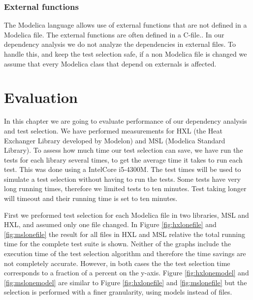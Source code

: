 \documentclass{cslthse-msc}
\begin{document}
\subsection{External functions}
The Modelica language allows use of external functions that are not defined in a Modelica file. The external functions are often defined in a C-file.\cite{modelicamodelica}. In our dependency analysis we do not analyze the dependencies in external files. To handle this, and keep the test selection safe, if a non Modelica file is changed we assume that every Modelica class that depend on externals is affected.


\chapter[Evaluation]{Evaluation}
In this chapter we are going to evaluate performance of our dependency analysis and test selection. We have performed measurements for HXL (the Heat Exchanger Library developed by Modelon) and MSL (Modelica Standard Library). To assess how much time our test selection can save, we have run the tests for each library several times, to get the average time it takes to run each test. This was done using a Intel\textregistered Core \texttrademark i5-4300M. The test times will be used to simulate a test selection without having to run the tests. Some tests have very long running times, therefore we limited tests to ten minutes. Test taking longer will timeout and their running time is set to ten minutes.

First we preformed test selection for each Modelica file in two libraries, MSL and HXL, and assumed only one file changed. In Figure \ref{fig:hxlonefile} and \ref{fig:mslonefile} the result for all files in HXL and MSL relative the total running time for the complete test suite is shown. Neither of the graphs include the execution time of the test selection algorithm and therefore the time savings are not completely accurate. However, in both cases the the test selection time corresponds to a fraction of a percent on the y-axis. Figure \ref{fig:hxlonemodel} and \ref{fig:mslonemodel} are similar to Figure \ref{fig:hxlonefile} and \ref{fig:mslonefile} but the selection is performed with a finer granularity, using models instead of files. 
\end{document}
